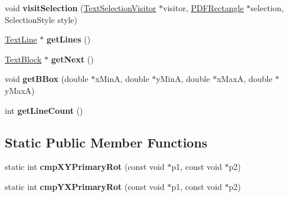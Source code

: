 \begin{DoxyCompactItemize}
void {\bfseries visit\+Selection} (\hyperlink{class_text_selection_visitor}{Text\+Selection\+Visitor} $\ast$visitor, \hyperlink{class_p_d_f_rectangle}{P\+D\+F\+Rectangle} $\ast$selection, Selection\+Style style)
\item 
\mbox{\label{class_text_block_a2751754e07403c306d11c7a15ec43b13}} 
\hyperlink{class_text_line}{Text\+Line} $\ast$ {\bfseries get\+Lines} ()
\item 
\mbox{\label{class_text_block_a1f7c5ee6d15112fca4010c04c443132c}} 
\hyperlink{class_text_block}{Text\+Block} $\ast$ {\bfseries get\+Next} ()
\item 
\mbox{\label{class_text_block_a9f5bfc0e43c4f7307ad4581ee75e3d97}} 
void {\bfseries get\+B\+Box} (double $\ast$x\+MinA, double $\ast$y\+MinA, double $\ast$x\+MaxA, double $\ast$y\+MaxA)
\item 
\mbox{\label{class_text_block_af200a7d5953dda6967553978e0b465b0}} 
int {\bfseries get\+Line\+Count} ()
\end{DoxyCompactItemize}
\subsection*{Static Public Member Functions}
\begin{DoxyCompactItemize}
\item 
\mbox{\label{class_text_block_ac55158306e9389e16a4085a6d06b88bf}} 
static int {\bfseries cmp\+X\+Y\+Primary\+Rot} (const void $\ast$p1, const void $\ast$p2)
\item 
\mbox{\label{class_text_block_a958d9465a3078d1b61192c93e86d1e07}} 
static int {\bfseries cmp\+Y\+X\+Primary\+Rot} (const void $\ast$p1, const void $\ast$p2)
\end{DoxyCompactItemize}
